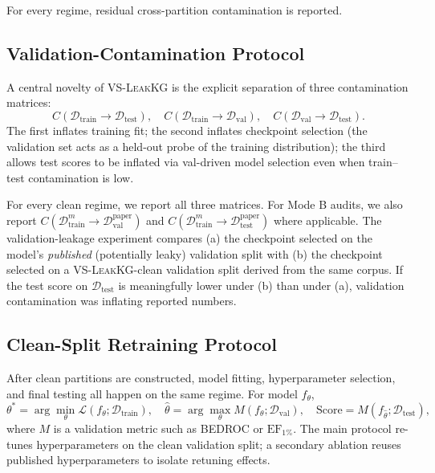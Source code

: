 \documentclass[11pt]{article}
\begin{document}
For every regime, residual cross-partition contamination is reported.

\subsection{Validation-Contamination Protocol}

A central novelty of \textsc{VS-LeakKG} is the explicit separation of three contamination matrices:
\[
C(\mathcal{D}_{\mathrm{train}} \to \mathcal{D}_{\mathrm{test}}),
\quad
C(\mathcal{D}_{\mathrm{train}} \to \mathcal{D}_{\mathrm{val}}),
\quad
C(\mathcal{D}_{\mathrm{val}} \to \mathcal{D}_{\mathrm{test}}).
\]
The first inflates training fit; the second inflates checkpoint selection (the validation set acts as a held-out probe of the training distribution); the third allows test scores to be inflated via val-driven model selection even when train--test contamination is low.

For every clean regime, we report all three matrices. For Mode B audits, we also report \(C(\mathcal{D}^{m}_{\mathrm{train}} \to \mathcal{D}_{\mathrm{val}}^{\text{paper}})\) and \(C(\mathcal{D}^{m}_{\mathrm{train}} \to \mathcal{D}_{\mathrm{test}}^{\text{paper}})\) where applicable. The validation-leakage experiment compares (a) the checkpoint selected on the model's \emph{published} (potentially leaky) validation split with (b) the checkpoint selected on a \textsc{VS-LeakKG}-clean validation split derived from the same corpus. If the test score on \(\mathcal{D}_{\mathrm{test}}\) is meaningfully lower under (b) than under (a), validation contamination was inflating reported numbers.

\subsection{Clean-Split Retraining Protocol}

After clean partitions are constructed, model fitting, hyperparameter selection, and final testing all happen on the same regime. For model \(f_\theta\),
\[
\theta^* = \arg\min_\theta \mathcal{L}(f_\theta; \mathcal{D}_{\mathrm{train}}),
\quad
\hat{\theta} = \arg\max_\theta M(f_\theta; \mathcal{D}_{\mathrm{val}}),
\quad
\mathrm{Score} = M(f_{\hat{\theta}}; \mathcal{D}_{\mathrm{test}}),
\]
where \(M\) is a validation metric such as BEDROC or \(\mathrm{EF}_{1\%}\). The main protocol re-tunes hyperparameters on the clean validation split; a secondary ablation reuses published hyperparameters to isolate retuning effects.
\end{document}
